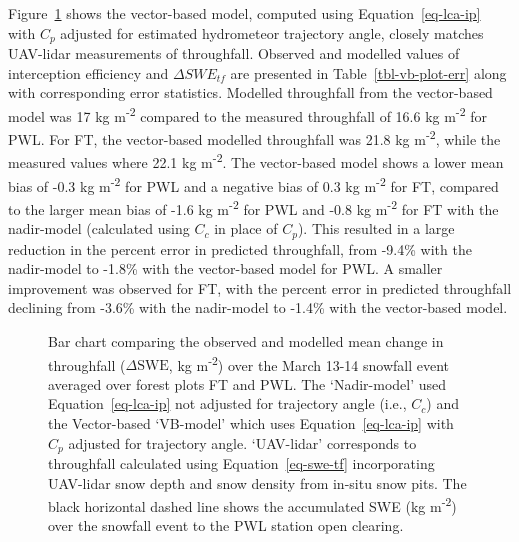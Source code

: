 \documentclass[
  letterpaper,
  DIV=11,
  numbers=noendperiod]{scrartcl}
\begin{document}
Figure~\ref{fig-event-tf} shows the vector-based model, computed using
Equation~\ref{eq-lca-ip} with \(C_p\) adjusted for estimated hydrometeor
trajectory angle, closely matches UAV-lidar measurements of throughfall.
Observed and modelled values of interception efficiency and
\(\Delta SWE_{tf}\) are presented in Table~\ref{tbl-vb-plot-err} along
with corresponding error statistics. Modelled throughfall from the
vector-based model was 17 kg m\textsuperscript{-2} compared to the
measured throughfall of 16.6 kg m\textsuperscript{-2} for PWL. For FT,
the vector-based modelled throughfall was 21.8 kg m\textsuperscript{-2},
while the measured values where 22.1 kg m\textsuperscript{-2}. The
vector-based model shows a lower mean bias of -0.3 kg
m\textsuperscript{-2} for PWL and a negative bias of 0.3 kg
m\textsuperscript{-2} for FT, compared to the larger mean bias of -1.6
kg m\textsuperscript{-2} for PWL and -0.8 kg m\textsuperscript{-2} for
FT with the nadir-model (calculated using \(C_c\) in place of \(C_p\)).
This resulted in a large reduction in the percent error in predicted
throughfall, from -9.4\% with the nadir-model to -1.8\% with the
vector-based model for PWL. A smaller improvement was observed for FT,
with the percent error in predicted throughfall declining from -3.6\%
with the nadir-model to -1.4\% with the vector-based model.

\begin{figure}[H]


\caption{\label{fig-event-tf}Bar chart comparing the observed and
modelled mean change in throughfall (\(\Delta \text{SWE}\), kg
m\textsuperscript{-2}) over the March 13-14 snowfall event averaged over
forest plots FT and PWL. The `Nadir-model' used Equation~\ref{eq-lca-ip}
not adjusted for trajectory angle (i.e., \(C_c\)) and the Vector-based
`VB-model' which uses Equation~\ref{eq-lca-ip} with \(C_p\) adjusted for
trajectory angle. `UAV-lidar' corresponds to throughfall calculated
using Equation~\ref{eq-swe-tf} incorporating UAV-lidar snow depth and
snow density from in-situ snow pits. The black horizontal dashed line
shows the accumulated SWE (kg m\textsuperscript{-2}) over the snowfall
event to the PWL station open clearing.}

\end{figure}%
\end{document}
